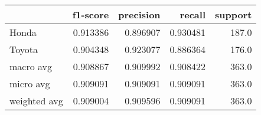\begin{tabular}{lrrrr}
\toprule
{} &  f1-score &  precision &    recall &  support \\
\midrule
Honda        &  0.913386 &   0.896907 &  0.930481 &    187.0 \\
Toyota       &  0.904348 &   0.923077 &  0.886364 &    176.0 \\
macro avg    &  0.908867 &   0.909992 &  0.908422 &    363.0 \\
micro avg    &  0.909091 &   0.909091 &  0.909091 &    363.0 \\
weighted avg &  0.909004 &   0.909596 &  0.909091 &    363.0 \\
\bottomrule
\end{tabular}
